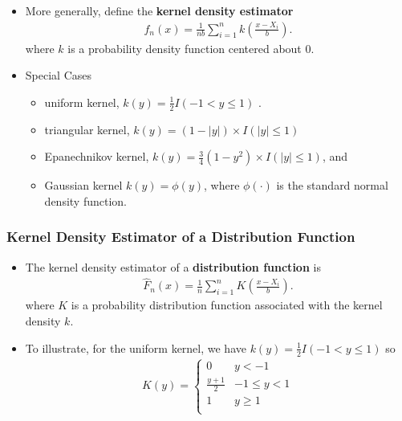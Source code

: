 \documentclass[]{book}
\begin{document}
\begin{itemize}
\item
  More generally, define the \textbf{kernel density estimator}
  \[\begin{aligned}
  \label{E:KDF2}
   f_n(x) = \frac{1}{nb} \sum_{i=1}^n k\left(\frac{x-X_i}{b}\right).\end{aligned}\]
  where \(k\) is a probability density function centered about 0.
\item
  Special Cases

  \begin{itemize}
  \item
    uniform kernel, \(k(y) = \frac{1}{2}I(-1 < y \leq 1)\) .
  \item
    triangular kernel, \(k(y) = (1-|y|)\times I(|y| \le 1)\)
  \item
    Epanechnikov kernel,
    \(k(y) = \frac{3}{4}(1-y^2) \times I(|y| \le 1)\), and
  \item
    Gaussian kernel \(k(y) = \phi(y)\), where \(\phi(\cdot)\) is the
    standard normal density function.
  \end{itemize}
\end{itemize}

\subsubsection{Kernel Density Estimator of a Distribution
Function}\label{kernel-density-estimator-of-a-distribution-function}

\begin{itemize}
\item
  The kernel density estimator of a \textbf{distribution function} is
  \[\begin{aligned}
   \hat{F}_n(x) = \frac{1}{n} \sum_{i=1}^n K\left(\frac{x-X_i}{b}\right).\end{aligned}\]
  where \(K\) is a probability distribution function associated with the
  kernel density \(k\).
\item
  To illustrate, for the uniform kernel, we have
  \(k(y) = \frac{1}{2}I(-1 < y \le 1)\) so \[\begin{aligned}
  K(y) =
  \begin{cases}
  0 &            y<-1\\
  \frac{y+1}{2}& -1 \le y < 1 \\
  1 & y \ge 1 \\
  \end{cases}\end{aligned}\]
\end{itemize}
\end{document}

